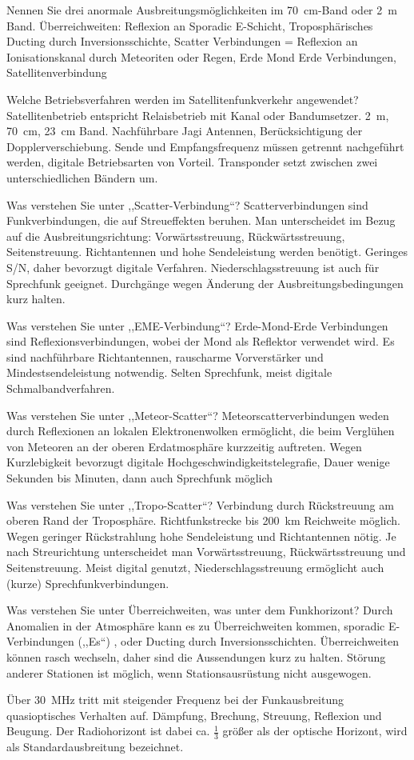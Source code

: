 \documentclass[avery5371,grid,frame,a4paper]{flashcards}
\newcommand{\card}[3]{
  \begin{flashcard}[{\chap} -- #1]{#2}#3\end{flashcard}
}
\begin{document}
\card{16}{Nennen Sie drei anormale Ausbreitungsmöglichkeiten im \SI{70}{\centi\metre}-Band oder 2~m Band.}{
  Überreichweiten: Reflexion an Sporadic E-Schicht, Troposphärisches Ducting durch Inversionsschichte, Scatter Verbindungen = Reflexion an Ionisationskanal durch Meteoriten oder Regen, Erde Mond Erde Verbindungen, Satellitenverbindung
}
\card{17}{Welche Betriebsverfahren werden im Satellitenfunkverkehr angewendet?}{
  Satellitenbetrieb entspricht Relaisbetrieb mit Kanal oder Bandumsetzer. 2~m, \SI{70}{\centi\metre}, \SI{23}{\centi\metre} Band. Nachführbare Jagi Antennen, Berücksichtigung der Dopplerverschiebung. Sende und Empfangsfrequenz müssen getrennt nachgeführt werden, digitale Betriebsarten von Vorteil. Transponder setzt zwischen zwei unterschiedlichen Bändern um.
}
\card{18}{Was verstehen Sie unter ,,Scatter-Verbindung``?}{
  Scatterverbindungen sind Funkverbindungen, die auf Streueffekten beruhen. Man unterscheidet im Bezug auf die Ausbreitungsrichtung: Vorwärtsstreuung, Rückwärtsstreuung, Seitenstreuung. Richtantennen und hohe Sendeleistung werden benötigt. Geringes S/N, daher bevorzugt digitale Verfahren. Niederschlagsstreuung ist auch für Sprechfunk geeignet. Durchgänge wegen Änderung der Ausbreitungsbedingungen kurz halten.
}
\card{19}{Was verstehen Sie unter ,,EME-Verbindung``?}{
  Erde-Mond-Erde Verbindungen sind Reflexionsverbindungen, wobei der Mond als Reflektor verwendet wird. Es sind nachführbare Richtantennen, rauscharme Vorverstärker und Mindestsendeleistung notwendig. Selten Sprechfunk, meist digitale Schmalbandverfahren.
}
\card{20}{Was verstehen Sie unter ,,Meteor-Scatter``?}{
  Meteorscatterverbindungen weden durch Reflexionen an lokalen Elektronenwolken ermöglicht, die beim Verglühen von Meteoren an der oberen Erdatmosphäre kurzzeitig auftreten. Wegen Kurzlebigkeit bevorzugt digitale Hochgeschwindigkeitstelegrafie, Dauer wenige Sekunden bis Minuten, dann auch Sprechfunk möglich
}
\card{21}{Was verstehen Sie unter ,,Tropo-Scatter``?}{
  Verbindung durch Rückstreuung am oberen Rand der Troposphäre. Richtfunkstrecke bis 200~km Reichweite möglich. Wegen geringer Rückstrahlung hohe Sendeleistung und Richtantennen nötig. Je nach Streurichtung unterscheidet man Vorwärtsstreuung, Rückwärtsstreuung und Seitenstreuung. Meist digital genutzt, Niederschlagsstreuung ermöglicht auch (kurze) Sprechfunkverbindungen.
}
\card{22}{Was verstehen Sie unter Überreichweiten, was unter dem Funkhorizont?}{
  \small
  Durch Anomalien in der Atmosphäre kann es zu Überreichweiten kommen, sporadic E-Verbindungen (,,Es``) , oder Ducting durch Inversionsschichten. Überreichweiten können rasch wechseln, daher sind die Aussendungen kurz zu halten. Störung anderer Stationen ist möglich, wenn Stationsausrüstung nicht ausgewogen.

  Über \SI{30}{\mega\Hz} tritt mit steigender Frequenz bei der Funkausbreitung quasioptisches Verhalten auf. Dämpfung, Brechung, Streuung, Reflexion und Beugung. Der Radiohorizont ist dabei ca. $\frac13$ größer als der optische Horizont, wird als Standardausbreitung bezeichnet.
}
\end{document}
